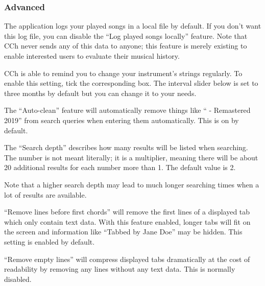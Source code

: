\documentclass[12pt, a4paper]{article}
\begin{document}
{                                \subsubsection{Advanced}
                                The application logs your played songs in a local file by default. If you don't want this log file, you can disable the ``Log played songs locally'' feature. Note that CCh never sends any of this data to anyone; this feature is merely existing to enable interested users to evaluate their musical history.\break
                                
                                CCh is able to remind you to change your instrument's strings regularly. To enable this setting, tick the corresponding box. The interval slider below is set to three months by default but you can change it to your needs.\break

                                The ``Auto-clean'' feature will automatically remove things like `` - Remastered 2019'' from search queries when entering them automatically. This is on by default.\break

                                The ``Search depth'' describes how many results will be listed when searching. The number is not meant literally; it is a multiplier, meaning there will be about 20 additional results for each number more than 1. The default value is 2.\break

                                Note that a higher search depth may lead to much longer searching times when a lot of results are available.\break

                                ``Remove lines before first chords'' will remove the first lines of a displayed tab which only contain text data. With this feature enabled, longer tabs will fit on the screen and information like ``Tabbed by Jane Doe'' may be hidden. This setting is enabled by default.\break

                                ``Remove empty lines'' will compress displayed tabs dramatically at the cost of readability by removing any lines without any text data. This is normally disabled.\break
                        }
\end{document}

